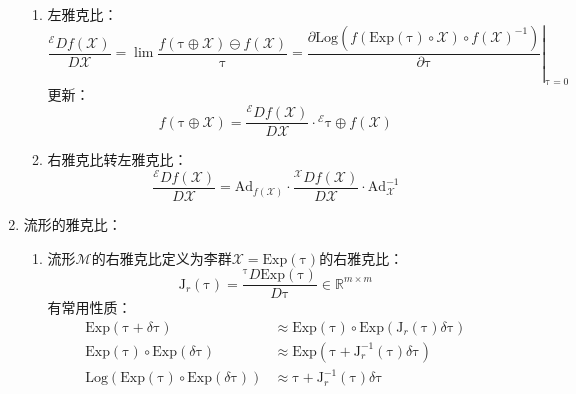 \documentclass[12pt, onecolumn]{article}
\newcommand\Exp[1]{\mathrm{Exp}\left( #1\right) }
\newcommand\Log[1]{\mathrm{Log}\left( #1\right) }
\newcommand\bsm[1]{\boldsymbol{\mathrm{#1}}}
\begin{document}
\begin{enumerate}
\begin{enumerate}
	\item 左雅克比：
	\begin{equation}
	\frac{{^\mathcal{E}Df(\mathcal{X})}}{D\mathcal{X}}
	=\lim\frac{f(\bsm{\tau}\oplus\mathcal{X})\ominus f(\mathcal{X})}{\bsm{\tau}}
	=\left. \frac{\partial \Log{f(\Exp{\bsm\tau}\circ\mathcal{X})\circ f(\mathcal{X})^{-1}}}{\partial \bsm{\tau}}\right|_{\bsm{\tau}=0}
	\end{equation}
	更新：
	\begin{equation}
	f(\bsm{\tau}\oplus\mathcal{X})= \frac{{^\mathcal{E}Df(\mathcal{X})}}{D\mathcal{X}}\cdot{^{\mathcal{E}}\bsm{\tau}}
	\oplus f(\mathcal{X})
	\end{equation}
	
	\item 右雅克比转左雅克比：
	\begin{equation}
	\frac{{^\mathcal{E}Df(\mathcal{X})}}{D\mathcal{X}}=
	\bsm{Ad}_{f(\mathcal{X})}\cdot\frac{{^\mathcal{X}Df(\mathcal{X})}}{D\mathcal{X}}
	\cdot\bsm{Ad}_{\mathcal{X}}^{-1}
	\end{equation}
	\end{enumerate}
	
	\item 流形的雅克比：
	\begin{enumerate}
	\item 流形$\mathcal{M}$的右雅克比定义为李群$\mathcal{X}=\Exp{\bsm\tau}$的右雅克比：
	\begin{equation}
	\bsm{J}_r(\bsm\tau)=\frac{^{\bsm{\tau}}D\Exp{\bsm\tau}}{D\bsm\tau}\in\mathbb{R}^{m\times m}
	\end{equation}
	有常用性质：
	\begin{equation}
	\begin{aligned}
		\Exp{\bsm{\tau}+\delta\bsm{\tau}}&\approx\Exp{\bsm\tau}\circ\Exp{\bsm{J}_r(\bsm\tau)\delta\bsm{\tau}}
		\\
		\Exp{\bsm\tau}\circ\Exp{\delta\bsm\tau}&\approx\Exp{\bsm{\tau}+\bsm{J}_r^{-1}(\bsm\tau)\delta\bsm{\tau}}
		\\
		\Log{\Exp{\bsm\tau}\circ\Exp{\delta\bsm\tau}}&\approx\bsm{\tau}+\bsm{J}_r^{-1}(\bsm\tau)\delta\bsm{\tau}
	\end{aligned}
	\end{equation}	
	

\end{enumerate}
\end{enumerate}
\end{document}
